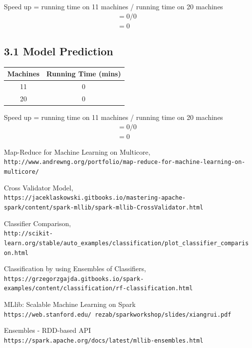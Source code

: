 \documentclass{neu_handout}
\begin{document}
\begin{center}
Speed up = running time on 11 machines / running time on 20 machines
\begin{multline}
= 0 / 0 \\
= 0
\end{multline}
\end{center}

\subsection*{3.1 Model Prediction}

\begin{center}
 \begin{tabular}{||c c ||} 
 \hline
Machines & Running Time (mins) \\ [0.5ex] 
 \hline\hline
 11 & 0  \\ 
  \hline
 20 & 0  \\ [1ex] 
 \hline
\end{tabular}
\end{center}

\begin{center}
Speed up = running time on 11 machines / running time on 20 machines
\begin{multline}
= 0 / 0 \\
= 0
\end{multline}
\end{center}

\newpage


\begin{thebibliography}{9}

Map-Reduce for Machine Learning on Multicore,
\\\texttt{http://www.andrewng.org/portfolio/map-reduce-for-machine-learning-on-multicore/}

Cross Validator Model,
\\\texttt{https://jaceklaskowski.gitbooks.io/mastering-apache-spark/content/spark-mllib/spark-mllib-CrossValidator.html}

Classifier Comparison,
\\\texttt{http://scikit-learn.org/stable/auto\_examples/classification/plot\_classifier\_comparison.html}

Classification by using Ensembles of Classifiers,
\\\texttt{https://grzegorzgajda.gitbooks.io/spark-examples/content/classification/rf-classification.html}


MLlib: Scalable Machine Learning on Spark
\\\texttt{https://web.stanford.edu/~rezab/sparkworkshop/slides/xiangrui.pdf}


Ensembles - RDD-based API
\\\texttt{https://spark.apache.org/docs/latest/mllib-ensembles.html}

\end{thebibliography}
\end{document}
